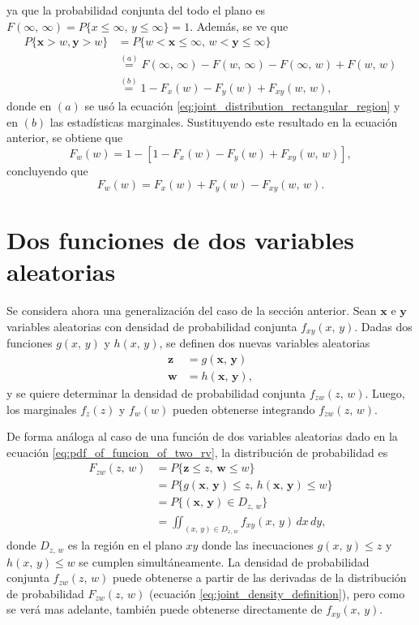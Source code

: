 \documentclass[a4paper]{report}
\newcommand{\x}{\mathbf{x}}
\newcommand{\y}{\mathbf{y}}
\newcommand{\w}{\mathbf{w}}
\newcommand{\z}{\mathbf{z}}
\begin{document}
ya que la probabilidad conjunta del todo el plano es \(F(\infty,\,\infty)=P\{x\leq\infty,\,y\leq\infty\}=1\). Además, se ve que
\begin{align*}
 P\{\x>w,\y>w\}&=P\{w<\x\leq \infty,\,w<\y\leq \infty\}\\
   &\overset{(a)}{=}F(\infty,\,\infty)-F(w,\,\infty)-F(\infty,\,w)+F(w,\,w)\\
   &\overset{(b)}{=}1-F_x(w)-F_y(w)+F_{xy}(w,\,w),
\end{align*}
donde en \((a)\) se usó la ecuación \ref{eq:joint_distribution_rectangular_region} y en \((b)\) las estadísticas marginales. Sustituyendo este resultado en la ecuación anterior, se obtiene que
\[
 F_w(w)=1-[1-F_x(w)-F_y(w)+F_{xy}(w,\,w)],
\]
concluyendo que
\begin{equation}\label{eq:joint_distribution_rv_min}
 F_w(w)=F_x(w)+F_y(w)-F_{xy}(w,\,w).
\end{equation}

\section{Dos funciones de dos variables aleatorias}\label{sec:two_funcions_of_two_rv}

Se considera ahora una generalización del caso de la sección anterior. Sean \(\x\) e \(\y\) variables aleatorias con densidad de probabilidad conjunta \(f_{xy}(x,\,y)\). Dadas dos funciones \(g(x,\,y)\) y \(h(x,\,y)\), se definen dos nuevas variables aleatorias
\begin{align*}
 \z&=g(\x,\,\y)\\
 \w&=h(\x,\,\y),
\end{align*}
y se quiere determinar la densidad de probabilidad conjunta \(f_{zw}(z,\,w)\). Luego, los marginales \(f_z(z)\) y \(f_w(w)\) pueden obtenerse integrando \(f_{zw}(z,\,w)\).

De forma análoga al caso de una función de dos variables aleatorias dado en la ecuación \ref{eq:pdf_of_funcion_of_two_rv}, la distribución de probabilidad es
\begin{align}\label{eq:pdf_of_two_funcion_of_two_rv}
 F_{zw}(z,\,w)&=P\{\z\leq z,\,\w\leq w\}\nonumber\\
    &=P\{g(\x,\,\y)\leq z,\,h(\x,\,\y)\leq w\}\nonumber\\
    &=P\{(\x,\,\y)\in D_{z,\,w}\}\nonumber\\
    &=\iint_{(x,\,y)\in D_{z,\,w}}f_{xy}(x,\,y)\,dx\,dy,
\end{align}
donde \(D_{z,\,w}\) es la región en el plano \(xy\) donde las inecuaciones \(g(x,\,y)\leq z\) y \(h(x,\,y)\leq w\) se cumplen simultáneamente. La densidad de probabilidad conjunta \(f_{zw}(z,\,w)\) puede obtenerse a partir de las derivadas de la distribución de probabilidad \(F_{zw}(z,\,w)\) (ecuación  \ref{eq:joint_density_definition}), pero como se verá mas adelante, también puede obtenerse directamente de \(f_{xy}(x,\,y)\).
\end{document}
